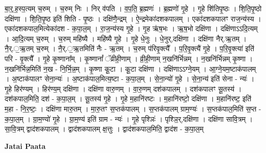 \documentclass[17pt]{extarticle}
\begin{document}
बा॒र्॒.ह॒स्प॒त्यम् च॒रुम् । च॒रुम् निः । निर् व॑पति । व॒प॒ति॒ ब्र॒ह्मणः॑ । ब्र॒ह्मणो॑ गृ॒हे । गृ॒हे शि॑तिपृ॒ष्ठः । शि॒ति॒पृ॒ष्ठो दक्षि॑णा । शि॒ति॒पृ॒ष्ठ इति॑ शिति - पृ॒ष्ठः । दक्षि॑णै॒न्द्रम् । ऐ॒न्द्रमेका॑दशकपालम् । एका॑दशकपालꣳ राज॒न्य॑स्य । एका॑दशकपाल॒मित्येका॑दश - क॒पा॒ल॒म् । रा॒ज॒न्य॑स्य गृ॒हे । गृ॒ह ऋ॑ष॒भः । ऋ॒ष॒भो दक्षि॑णा । दक्षि॑णाऽऽदि॒त्यम् । आ॒दि॒त्यम् च॒रुम् । च॒रुम् महि॑ष्यै । महि॑ष्यै गृ॒हे । गृ॒हे धे॒नुः । धे॒नुर्,दक्षि॑णा । दक्षि॑णा नैर्.ऋ॒तम् । नै॒र्.॒ऋ॒तम् च॒रुम् । नै॒र्.॒ऋ॒तमिति॑ नैः - ऋ॒तम् । च॒रुम् प॑रिवृ॒क्त्यै᳚ । प॒रि॒वृ॒क्त्यै॑ गृ॒हे । प॒रि॒वृ॒क्त्या॑ इति॑ परि - वृ॒क्त्यै᳚ । गृ॒हे कृ॒ष्णाना᳚म् । कृ॒ष्णानां᳚ ॅव्रीही॒णाम् । व्री॒ही॒णाम् न॒खनि॑र्भिन्नम् । न॒खनि॑र्भिन्नम् कृ॒ष्णा । न॒खनि॑र्भिन्न॒मिति॑ न॒ख - नि॒र्भि॒न्न॒म् । कृ॒ष्णा कू॒टा । कू॒टा दक्षि॑णा । दक्षि॑णाऽऽग्ने॒यम् । आ॒ग्ने॒यम॒ष्टाक॑पालम् । अ॒ष्टाक॑पालꣳ सेना॒न्यः॑ । अ॒ष्टाक॑पाल॒मित्य॒ष्टा - क॒पा॒ल॒म् । से॒ना॒न्यो॑ गृ॒हे । से॒ना॒न्य॑ इति॑ सेना - न्यः॑ । गृ॒हे हिर॑ण्यम् । हिर॑ण्य॒म् दक्षि॑णा । दक्षि॑णा वारु॒णम् । वा॒रु॒णम् दश॑कपालम् । दश॑कपालꣳ सू॒तस्य॑ । दश॑कपाल॒मिति॒ दश॑ - क॒पा॒ल॒म् । सू॒तस्य॑ गृ॒हे । गृ॒हे म॒हानि॑रष्टः । म॒हानि॑रष्टो॒ दक्षि॑णा । म॒हानि॑रष्ट॒ इति॑ म॒हा - नि॒र॒ष्टः॒ । दक्षि॑णा मारु॒तम् । मा॒रु॒तꣳ स॒प्तक॑पालम् । स॒प्तक॑पालम् ग्राम॒ण्यः॑ । स॒प्तक॑पाल॒मिति॑ स॒प्त - क॒पा॒ल॒म् । ग्रा॒म॒ण्यो॑ गृ॒हे । ग्रा॒म॒ण्य॑ इति॑ ग्राम - न्यः॑ । गृ॒हे पृश्ञिः॑ । पृश्ञि॒र्,दक्षि॑णा । दक्षि॑णा सावि॒त्रम् । सा॒वि॒त्रम् द्वाद॑शकपालम् । द्वाद॑शकपालम् क्ष॒त्तुः । द्वाद॑शकपाल॒मिति॒ द्वाद॑श - क॒पा॒ल॒म् \newline

\textbf{Jatai Paata} \newline
\end{document}
